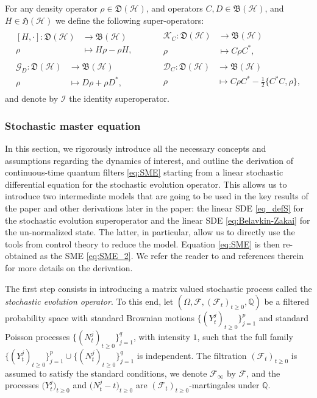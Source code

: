\documentclass[aihp,12pt]{imsart}
\newcommand{\Dc}{\mathcal{D}}
\newcommand{\Gc}{\mathcal{G}}
\newcommand{\Hc}{\mathcal{H}}
\newcommand{\Ic}{\mathcal{I}}
\newcommand{\Kc}{\mathcal{K}}
\newcommand{\Bf}{\mathfrak{B}}
\newcommand{\Hf}{\mathfrak{H}}
\newcommand{\Df}{\mathfrak{D}}
\theoremstyle{theorem}
\theoremstyle{definition}
\theoremstyle{remark}
\begin{document}
For any density operator $\rho\in\Df(\Hc)$, and operators $C, D\in\Bf(\Hc)$, and $H\in\Hf(\Hc)$ we define the following super-operators: 
\begin{align}
\begin{aligned}
\begin{split}
    [H,\cdot]: \Df(\Hc) &\to \Bf(\Hc)\\ \rho&\mapsto H\rho -\rho H,
\end{split}\qquad
&\begin{split}
    \Kc_C: \Df(\Hc) &\to \Bf(\Hc)\\ \rho&\mapsto C\rho C^*,
\end{split}\\
\begin{split}
    \Gc_{D}: \Df(\Hc) &\to \Bf(\Hc)\\ \rho&\mapsto D\rho + \rho D^*,
\end{split}\qquad
&\begin{split}
    \Dc_C: \Df(\Hc) &\to \Bf(\Hc)\\ \rho&\mapsto C\rho C^* - \frac{1}{2}\{C^* C, \rho\},
\end{split}
\end{aligned}
\label{eq:fundamental_super_operators}
\end{align}
and denote by $\Ic$ the identity superoperator. 

\subsubsection{Stochastic master equation}
In this section,  we rigorously introduce all the necessary concepts and assumptions regarding the dynamics of interest, and outline the derivation of continuous-time quantum filters \eqref{eq:SME} starting from a linear stochastic differential equation for the stochastic evolution operator. This allows us to introduce two intermediate models that are going to be used in the key results of the paper and other derivations later in the paper: the linear SDE \eqref{eq_defS} for the stochastic evolution superoperator and the linear SDE \eqref{eq:Belavkin-Zakai} for the un-normalized state. The latter, in particular, allow us to directly use the tools from control theory to reduce the model. Equation \eqref{eq:SME} is then re-obtained as the SME \eqref{eq:SME_2}. We refer the reader to \cite{barchielliholevo,barchielli2009quantum,Benoist2021} and references therein for more details on the derivation. 

The first step consists in introducing a matrix valued stochastic process called the \emph{stochastic evolution operator}. To this end, let $(\Omega,\mathcal F,(\mathcal F_t)_{t\geq0},\mathbb Q)$ be a filtered probability space with standard Brownian motions $\{(Y_t^j)_{t\geq0}\}_{j=1}^p$ and standard Poisson processes  $\{(N_t^j)_{t\geq0}\}_{j=1}^q$, with intensity $1$, such that the full family $\{(Y_t^j)_{t\geq0}\}_{j=1}^p\cup\{(N_t^j)_{t\geq0}\}_{j=1}^q$ is independent. The filtration $(\mathcal F_t)_{t\geq0}$ is assumed to satisfy the standard conditions, we denote $\mathcal F_{\infty}$ by $\mathcal F$, and the processes $\big(Y_t^j\big)_{t\geq0}$ and $\big(N_t^j-t\big)_{t\geq0}$ are $(\mathcal F_t)_{t\geq0}$-martingales under $\mathbb Q$. 
\end{document}
